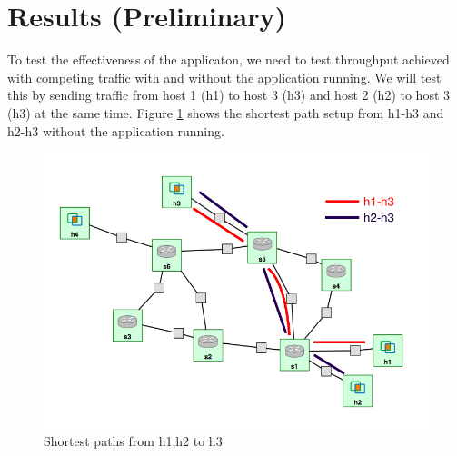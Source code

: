 \documentclass[paper=a4, fontsize=12pt]{scrartcl}	%
\numberwithin{equation}{section}		%
\numberwithin{figure}{section}			%
\numberwithin{table}{section}				%
\begin{document}
\section{Results (Preliminary)}
To test the effectiveness of the applicaton, we need to test throughput achieved with competing traffic with and without the application running. We will test this by sending traffic from host 1 (h1) to host 3 (h3) and host 2 (h2) to host 3 (h3) at the same time. Figure \ref{Fig 5.1} shows the shortest path setup from h1-h3 and h2-h3 without the application running.
\begin{figure}[H]
\begin{center}
\includegraphics[scale=0.45]{shortest.png}   
\end{center}
 \caption{Shortest paths from h1,h2 to h3}
 \label{Fig 5.1}
\end{figure}
\end{document}
